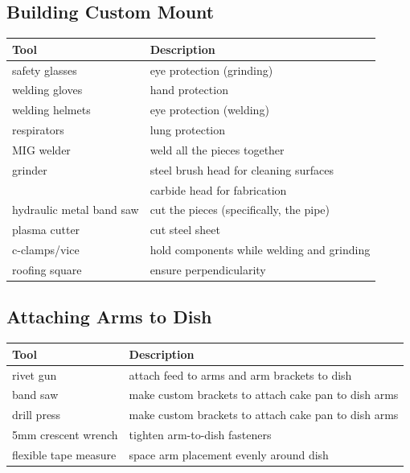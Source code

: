 \documentclass[11pt]{article} %
\begin{document}
\subsection{Building Custom Mount}
\begin{tabular}{| l | p{10cm} |}
\hline
\textbf{Tool} & \textbf{Description} \\ \hline \hline
safety glasses & eye protection (grinding) \\ \hline
welding gloves & hand protection \\ \hline
welding helmets & eye protection (welding)\\ \hline
respirators & lung protection \\ \hline
MIG welder & weld all the pieces together \\ \hline
grinder & steel brush head for cleaning surfaces \\ \hline
 & carbide head for fabrication \\ \hline
hydraulic metal band saw & cut the pieces (specifically, the pipe) \\ \hline
plasma cutter &cut steel sheet \\ \hline
c-clamps/vice & hold components while welding and grinding \\ \hline
roofing square & ensure perpendicularity \\ \hline
\end{tabular}


\subsection{Attaching Arms to Dish}
\begin{tabular}{| l | p{10cm} |}
\hline
\textbf{Tool} & \textbf{Description} \\ \hline \hline
rivet gun & attach feed to arms and arm brackets to dish \\ \hline
band saw & make custom brackets to attach cake pan to dish arms \\ \hline
drill press & make custom brackets to attach cake pan to dish arms \\ \hline
5mm crescent wrench & tighten arm-to-dish fasteners \\ \hline
flexible tape measure & space arm placement evenly around dish \\ \hline
\end{tabular}
\end{document}
